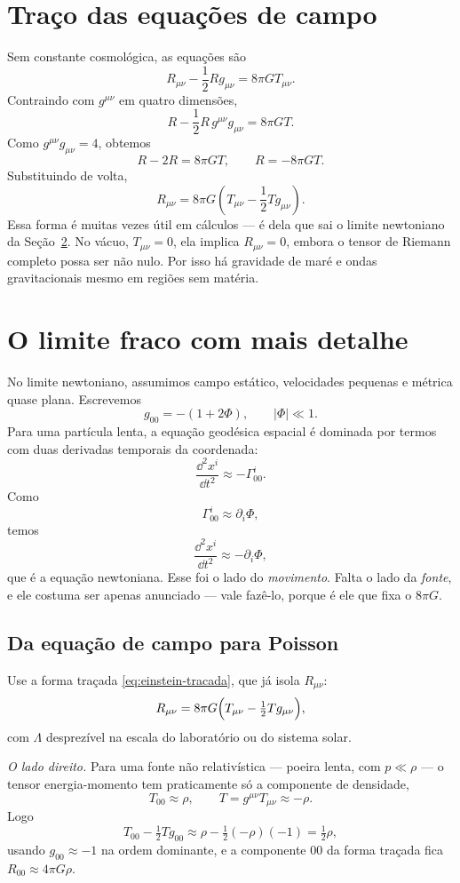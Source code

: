 \documentclass[12pt,a4paper,oneside]{book}
\theoremstyle{rgplain}
\theoremstyle{rgremark}
\begin{document}
\section{Traço das equações de campo}

Sem constante cosmológica, as equações são
\[
  R_{\mu\nu}-\frac{1}{2}Rg_{\mu\nu}=8\pi G T_{\mu\nu}.
\]
Contraindo com $g^{\mu\nu}$ em quatro dimensões,
\[
  R-\frac{1}{2}R\,g^{\mu\nu}g_{\mu\nu}=8\pi G T.
\]
Como $g^{\mu\nu}g_{\mu\nu}=4$, obtemos
\[
  R-2R=8\pi G T,
  \qquad
  R=-8\pi G T.
\]
Substituindo de volta,
\begin{equation}
  R_{\mu\nu}=8\pi G\left(T_{\mu\nu}-\frac{1}{2}Tg_{\mu\nu}\right).
  \label{eq:einstein-tracada}
\end{equation}
Essa forma é muitas vezes útil em cálculos --- é dela que sai o limite
newtoniano da Seção~\ref{sec:limite-fraco}. No vácuo, $T_{\mu\nu}=0$, ela
implica $R_{\mu\nu}=0$, embora o tensor de Riemann completo possa ser não nulo.
Por isso há gravidade de maré e ondas gravitacionais mesmo em regiões sem
matéria.

\section{O limite fraco com mais detalhe}
\label{sec:limite-fraco}

No limite newtoniano, assumimos campo estático, velocidades pequenas e métrica
quase plana. Escrevemos
\[
  g_{00}=-(1+2\Phi),\qquad |\Phi|\ll1.
\]
Para uma partícula lenta, a equação geodésica espacial é dominada por termos
com duas derivadas temporais da coordenada:
\[
  \frac{\dd^2 x^i}{\dd t^2}\approx-\Gamma^i_{00}.
\]
Como
\[
  \Gamma^i_{00}\approx \partial_i\Phi,
\]
temos
\[
  \frac{\dd^2 x^i}{\dd t^2}\approx-\partial_i\Phi,
\]
que é a equação newtoniana. Esse foi o lado do \emph{movimento}. Falta o lado
da \emph{fonte}, e ele costuma ser apenas anunciado --- vale fazê-lo, porque é
ele que fixa o $8\pi G$.

\subsection*{Da equação de campo para Poisson}

Use a forma traçada \eqref{eq:einstein-tracada}, que já isola $R_{\mu\nu}$:
\[
  R_{\mu\nu}=8\pi G\Bigl(T_{\mu\nu}-\tfrac12 Tg_{\mu\nu}\Bigr) ,
\]
com $\Lambda$ desprezível na escala do laboratório ou do sistema solar.

\emph{O lado direito.} Para uma fonte não relativística --- poeira lenta, com
$p\ll\rho$ --- o tensor energia-momento tem praticamente só a componente de
densidade,
\[
  T_{00}\approx\rho ,
  \qquad
  T=g^{\mu\nu}T_{\mu\nu}\approx-\rho .
\]
Logo
\[
  T_{00}-\tfrac12 Tg_{00}
  \approx\rho-\tfrac12(-\rho)(-1)=\tfrac12\rho ,
\]
usando $g_{00}\approx-1$ na ordem dominante, e a componente $00$ da forma
traçada fica $R_{00}\approx4\pi G\rho$.
\end{document}
